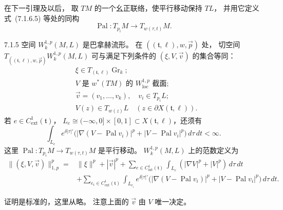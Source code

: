 在下一引理及以后，
取 $TM$ 的一个幺正联络，使平行移动保持 $TL$，
并用它定义式~(7.1.6.5) 等处的同构
\[
\operatorname{Pal}\colon T_{p_i}M\longrightarrow T_{w(\tau,t)}M.
\]

\begin{lemma}{7.1.5}\label{lem:7-1-5}
空间 $W_k^{1,p}(M,L)$ 是巴拿赫流形。
在 $((\mathfrak t,\ell),w,\vec p)$ 处，
切空间
$T_{((\mathfrak t,\ell),w,\vec p)}W_k^{1,p}(M,L)$
可与满足下列条件的 $(\xi,V,\vec v)$ 的集合等同：
\begin{align*}
&\xi\in T_{(\mathfrak t,\ell)}\operatorname{Gr}_k;
  \tag{7.1.6.1}\label{eq:7-1-6-1}\\
&V\text{ 是 }w^*(TM)\text{ 的 }W^{1,p}_{\mathrm{loc}}\text{ 截面};
  \tag{7.1.6.2}\label{eq:7-1-6-2}\\
&\vec v=(v_1,\ldots,v_k),\quad v_i\in T_{p_i}L;
  \tag{7.1.6.3}\label{eq:7-1-6-3}\\
&V(z)\in T_{w(z)}L\quad
  (z\in\partial X(\mathfrak t,\ell)).
  \tag{7.1.6.4}\label{eq:7-1-6-4}
\end{align*}
若 $e\in C^1_{\mathrm{ext}}(\mathfrak t)$，
$L_e\cong(-\infty,0]\times[0,1]
\subset X(\mathfrak t,\ell)$，还须有
\begin{equation}
\int_{L_e}e^{\delta|\tau|'}
\bigl(|\nabla(V-\operatorname{Pal}v_i)|^p
      +|V-\operatorname{Pal}v_i|^p\bigr)
\,d\tau\,dt<\infty.
\tag{7.1.6.5}\label{eq:7-1-6-5}
\end{equation}
这里
$\operatorname{Pal}\colon T_{p_i}M\to T_{w(\tau,t)}M$
是平行移动。
$W_k^{1,p}(M,L)$ 上的范数定义为
\[
\begin{aligned}
\|(\xi,V,\vec v)\|_{1,p}^p
={}&\|\xi\|^p+|\vec v|^p
+\sum_{e\in C^1_{\mathrm{int}}(\mathfrak t)}
  \int_{L_e}(|\nabla V|^p+|V|^p)\,d\tau\,dt\\
&+\sum_{e_i\in C^1_{\mathrm{ext}}(\mathfrak t)}
  \int_{L_{e_i}}e^{\delta|\tau|'}
  \bigl(|\nabla(V-\operatorname{Pal}v_i)|^p
       +|V-\operatorname{Pal}v_i|^p\bigr)
  \,d\tau\,dt.
\end{aligned}
\]
\end{lemma}

证明是标准的，这里从略。
注意上面的 $\vec v$ 由 $V$ 唯一决定。

